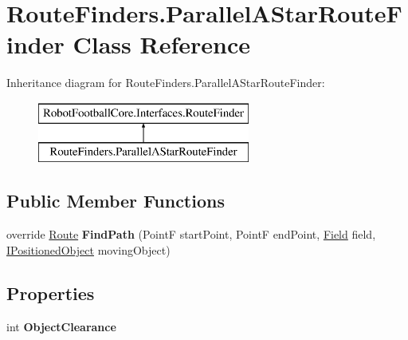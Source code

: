 \hypertarget{class_route_finders_1_1_parallel_a_star_route_finder}{\section{Route\-Finders.\-Parallel\-A\-Star\-Route\-Finder Class Reference}
\label{class_route_finders_1_1_parallel_a_star_route_finder}
}
Inheritance diagram for Route\-Finders.\-Parallel\-A\-Star\-Route\-Finder\-:\begin{figure}[H]
\begin{center}
\leavevmode
\includegraphics[height=2.000000cm]{class_route_finders_1_1_parallel_a_star_route_finder}
\end{center}
\end{figure}
\subsection*{Public Member Functions}
\begin{DoxyCompactItemize}
\item 
\hypertarget{class_route_finders_1_1_parallel_a_star_route_finder_acf37497c89b5cf4d25bd8eba01ef3700}{override \hyperlink{class_robot_football_core_1_1_route_objects_1_1_route}{Route} {\bfseries Find\-Path} (Point\-F start\-Point, Point\-F end\-Point, \hyperlink{class_robot_football_core_1_1_objects_1_1_field}{Field} field, \hyperlink{interface_robot_football_core_1_1_interfaces_1_1_i_positioned_object}{I\-Positioned\-Object} moving\-Object)}\label{class_route_finders_1_1_parallel_a_star_route_finder_acf37497c89b5cf4d25bd8eba01ef3700}

\end{DoxyCompactItemize}
\subsection*{Properties}
\begin{DoxyCompactItemize}
\item 
\hypertarget{class_route_finders_1_1_parallel_a_star_route_finder_a1675ac69e0fbcdc73ee5da6bfc729ccf}{int {\bfseries Object\-Clearance}}\label{class_route_finders_1_1_parallel_a_star_route_finder_a1675ac69e0fbcdc73ee5da6bfc729ccf}

\end{DoxyCompactItemize}
